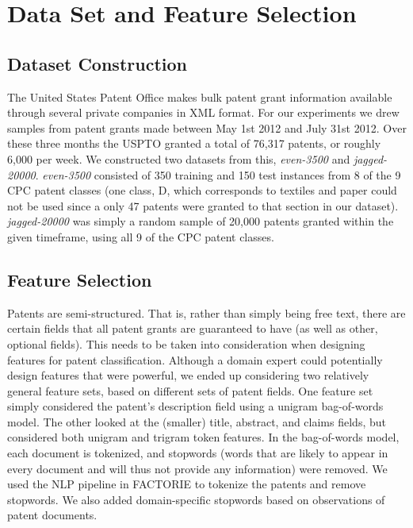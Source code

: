 \section{Data Set and Feature Selection}

\subsection{Dataset Construction}
The United States Patent Office makes bulk patent grant information available through several private companies\nocite{USPTO:2013:patent-catalog} in XML format\nocite{USPTO:2013:dtd}. For our experiments we drew samples from patent grants made between May 1st 2012 and July 31st 2012. Over these three months the USPTO granted a total of 76,317 patents, or roughly 6,000 per week. We constructed two datasets from this, \emph{even-3500} and \emph{jagged-20000}. \emph{even-3500} consisted of 350 training and 150 test instances from 8 of the 9 CPC patent classes (one class, D, which corresponds to textiles and paper could not be used since a only 47 patents were granted to that section in our dataset). \emph{jagged-20000} was simply a random sample of 20,000 patents granted within the given timeframe, using all 9 of the CPC patent classes.

\subsection{Feature Selection}
Patents are semi-structured. That is, rather than simply being free text, there are certain fields that all patent grants are guaranteed to have (as well as other, optional fields). This needs to be taken into consideration when designing features for patent classification. Although a domain expert could potentially design features that were powerful, we ended up considering two relatively general feature sets, based on different sets of patent fields. One feature set simply considered the patent's description field using a unigram bag-of-words model. The other looked at the (smaller) title, abstract, and claims fields, but considered both unigram and trigram token features. In the bag-of-words model, each document is tokenized, and stopwords (words that are likely to appear in every document and will thus not provide any information) were removed. We used the NLP pipeline in FACTORIE to tokenize the patents and remove stopwords. We also added domain-specific stopwords based on observations of patent documents. 
\indent

